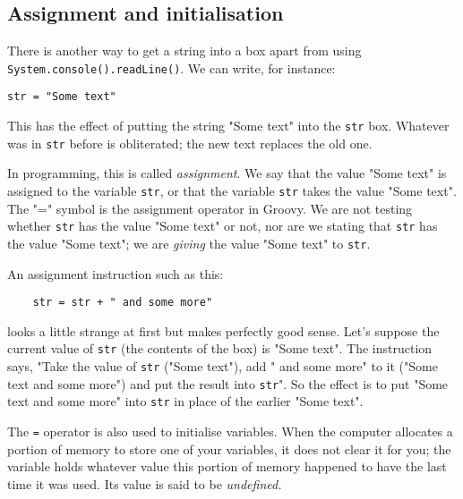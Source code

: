 
\subsection{Assignment and initialisation}

There is another way to get a string into a box apart from using
\verb!System.console().readLine()!.  We can write, for instance:

\begin{Verbatim}
str = "Some text"
\end{Verbatim}

This has the effect of putting the string "Some text" into the
\verb!str! box.  Whatever was in \verb!str! before is obliterated; the
new text replaces the old one. 

In programming, this is called \emph{assignment}.  We say that the
value "Some text" is
assigned to the variable \verb!str!, or that the variable \verb!str! takes the
value "Some text".  The "=" symbol is the assignment operator in Groovy.  We are not
testing whether \verb!str! has the value "Some text" or not, nor are we stating that
\verb!str! has the value "Some text"; we are \emph{giving} the value
"Some text" to \verb!str!.

%

An assignment instruction such as this:

\begin{Verbatim}
    str = str + " and some more"
\end{Verbatim}

looks a little strange at first but makes perfectly good sense.
Let's suppose the current value of \verb!str! (the contents of the
box) is "Some text".
The instruction says, "Take the value of \verb!str!
("Some text"), add " and some more"  to it ("Some text and some
more") 
and put the result into \verb!str!".
So the effect is to put "Some text and some more" into \verb!str! in
place of the earlier "Some text".

The \verb!=! operator is also used to initialise variables.  When the computer
allocates a portion of memory to store one of your variables, it does not
clear it for you; the variable holds whatever value this portion of memory
happened to have the last time it was used.  Its value is said to be
\emph{undefined.}

